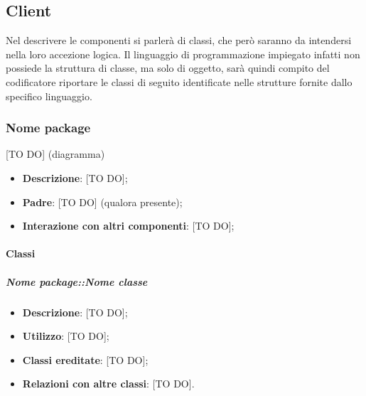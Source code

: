 %


\subsection{Client} %
\label{sub:client}
Nel descrivere le componenti si parlerà di classi, che però saranno da intendersi nella loro accezione logica. Il linguaggio di programmazione impiegato infatti non possiede la struttura di classe, ma solo di oggetto, sarà quindi compito del codificatore riportare le classi di seguito identificate nelle strutture fornite dallo specifico linguaggio.

	\subsubsection{Nome package} %
	\label{ssub:nome_del_package}
	[TO DO] (diagramma) \newline \newline

	\begin{itemize}
		\item \textbf{Descrizione}: [TO DO];
		\item \textbf{Padre}: [TO DO] (qualora presente);
		\item \textbf{Interazione con altri componenti}: [TO DO];
	\end{itemize}

		\paragraph{Classi} %
			\subparagraph{Nome package::Nome classe} %
			\label{subp:subparagraph_name}
				\begin{itemize}
					\item \textbf{Descrizione}: [TO DO];
					\item \textbf{Utilizzo}: [TO DO];
					\item \textbf{Classi ereditate}: [TO DO];
					\item \textbf{Relazioni con altre classi}: [TO DO].
				\end{itemize}



